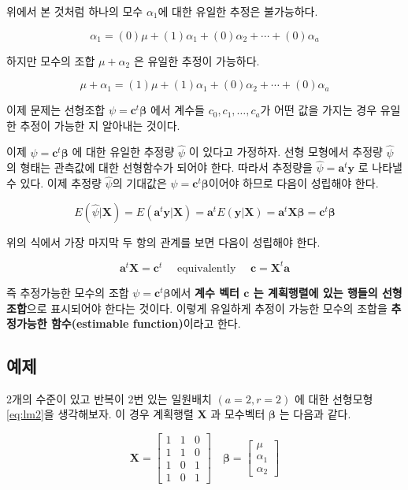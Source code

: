\documentclass[
]{book}
\theoremstyle{definition}
\theoremstyle{definition}
\theoremstyle{definition}
\theoremstyle{definition}
\theoremstyle{remark}
\begin{document}
위에서 본 것처럼 하나의 모수 \(\alpha_1\)에 대한 유일한 추정은 불가능하다.

\[  \alpha_1 = (0) \mu + (1) \alpha_1 + (0) \alpha_2 + \cdots + (0) \alpha_a \]

하지만 모수의 조합 \(\mu+ \alpha_2\) 은 유일한 추정이 가능하다.

\[  \mu + \alpha_1 = (1) \mu + (1) \alpha_1 + (0) \alpha_2 + \cdots + (0) \alpha_a \]

이제 문제는 선형조합 \(\psi= \bm c^t \bm \beta\) 에서 계수들 \(c_0, c_1, \dots, c_a\)가 어떤 값을 가지는 경우 유일한 추정이 가능한 지 알아내는 것이다.

이제 \(\psi = \bm c^t \bm \beta\) 에 대한 유일한 추정량 \(\hat \psi\) 이 있다고 가정하자. 선형 모형에서 추정량 \(\hat \psi\)의 형태는 관측값에 대한 선형함수가 되어야 한다. 따라서 추정량을 \(\hat \psi = \bm a^t \bm y\) 로 나타낼 수 있다. 이제 추정량 \(\hat \psi\)의 기대값은 \(\psi=\bm c^t \bm \beta\)이어야 하므로 다음이 성립해야 한다.

\[ E(\hat \psi| \bm X) = E(\bm a^t \bm y| \bm X) = \bm a^t E(\bm y| \bm X) = \bm a^t \bm X \bm \beta = \bm c^t \bm \beta \]

위의 식에서 가장 마지막 두 항의 관계를 보면 다음이 성립해야 한다.

\begin{equation}
\bm a^t \bm X = \bm c^t  \quad \text{ equivalently }\quad \bm c = \bm X^t \bm a
\label{eq:estimable}
\end{equation}

즉 추정가능한 모수의 조합 \(\psi = \bm c^t \bm \beta\)에서 \textbf{계수 벡터 \(\bm c\) 는 계획행렬에 있는 행들의 선형 조합}으로 표시되어야 한다는 것이다. 이렇게 유일하게 추정이 가능한
모수의 조합을 \textbf{추정가능한 함수(estimable function)}이라고 한다.

\hypertarget{uxc608uxc81c}{%
\subsection{예제}\label{uxc608uxc81c}}

2개의 수준이 있고 반복이 2번 있는 일원배치 \((a=2,r=2)\) 에 대한 선형모형 \eqref{eq:lm2}을 생각해보자. 이 경우 계획행렬 \(\bm X\) 과 모수벡터 \(\bm \beta\) 는 다음과 같다.

\begin{equation}
\bm X = 
\begin{bmatrix}
1 & 1 & 0  \\
1 & 1 & 0  \\
1 & 0 & 1  \\
1 & 0 & 1  
\end{bmatrix}
\quad 
\bm \beta = 
\begin{bmatrix}
\mu \\
\alpha_1 \\
\alpha_2 
\end{bmatrix}
\end{equation}
\end{document}
